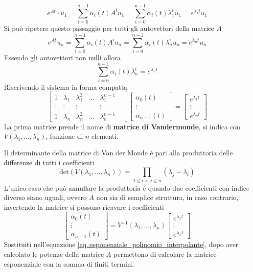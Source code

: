 $$
e^{At} \cdot u_1 = \sum_{i=0}^{n-1} \alpha_i(t)A^iu_1 =
\sum_{i=0}^{n-1}\alpha_i(t)\lambda^i_1 u_1 = e^{\lambda_1 t} u_1
$$
Si può ripetere questo passaggio per tutti gli autovettori della matrice $A$
$$
e^{At}u_n = \sum_{i=0}^{n-1} \alpha_i(t)A^iu_n = \sum_{i=0}^{n-1}
\alpha_i(t)\lambda_n^i u_n = e^{\lambda_n t} u_n
$$
Essendo gli autovettori non nulli allora
$$
\sum_{i=0}^{n-1} \alpha_i(t) \lambda^i_n = e^{\lambda_n t}
$$
Riscrivendo il sistema in forma compatta
$$
\begin{bmatrix}
1 &\lambda_1 & \lambda_1^2 & \ldots & \lambda_1^{n-1}\\
\vdots &\vdots  &\vdots    &              & \vdots&         \\
1  &\lambda_n & \lambda_n^2 & \ldots &\lambda_n^{n-1}
\end{bmatrix}
\begin{bmatrix}
                \alpha_0(t) \\ \vdots \\ \alpha_{n-1}(t)
                \end{bmatrix} = \begin{bmatrix}
                                e^{\lambda_1 t} \\ \vdots \\ e^{\lambda_n t}
                                \end{bmatrix}
$$
La prima matrice prende il nome di \textbf{matrice di Vandermonde}, si indica
con \linebreak $V(\lambda_1,\ldots,\lambda_n)$, funzione di $n$ elementi.

Il determinante della matrice di Van der Monde è pari alla produttoria delle
differenze di tutti i coefficienti
$$
\text{det}\left(V\left(\lambda_1,\ldots,\lambda_n\right)\right) = \prod_{1\leq
i < j \leq n } (\lambda_j - \lambda_i)
$$
L'unico caso che può annullare la produttoria è quando due coefficienti con
indice diverso siano uguali, ovvero $A$ non sia di semplice struttura, in caso
contrario, invertendo la matrice si possono ricavare i coefficienti
$$
\begin{bmatrix}
\alpha_0(t)\\
\vdots \\
\alpha_{n-1}(t)
\end{bmatrix} =
V^{-1}(\lambda_1,\ldots,\lambda_n)
\begin{bmatrix}
e^{\lambda_1 t}\\
\vdots \\
e^{\lambda_n t}
\end{bmatrix}
$$
Sostituiti nell'equazione \ref{eq.:esponenziale_polinomio_interpolante}, dopo
aver calcolato le potenze della matrice $A$ permettono di calcolare la matrice
esponenziale con la somma di finiti termini.

